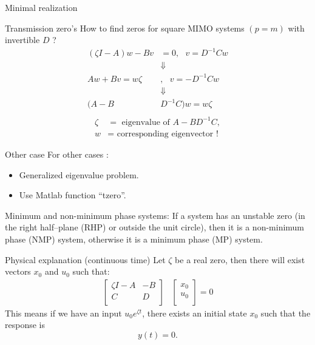 \begin{subsection}{Minimal realization}
\begin{frame}{Transmission zero's}
How to find zeros for square MIMO systems $(p = m)$ with
invertible $D$ ?
\begin{align*}
(\zeta I-A)w-Bv&=0,\text{ }v=D^{-1}Cw\\
&\Downarrow\\
Aw + Bv = w\zeta&,\text{ } v = −D^{-1}Cw\\
&\Downarrow\\
(A-B&D^{-1}C)w=w\zeta\\
\end{align*}
\vspace{-1cm}
\begin{align*}
\zeta &=\text{ eigenvalue of }A-BD^{-1}C,\\
w&=\text{ corresponding eigenvector !}
\end{align*}
\end{frame}

\begin{frame}{Other case}
For other cases :
\begin{itemize}
\item Generalized eigenvalue problem.
\item Use Matlab function “tzero”.
\end{itemize}
\vspace{0.5cm}
Minimum and non-minimum phase systems:
If a system has an unstable zero (in the right half–plane
(RHP) or outside the unit circle), then it is a non-minimum
phase (NMP) system, otherwise it is a minimum phase
(MP) system.
\end{frame}

\begin{frame}{Physical explanation (continuous time)}
Let $\zeta$ be a real zero, then there will exist vectors $x_0$ and $u_0$
such that:
\begin{align*}
\begin{bmatrix}
    \zeta I-A&-B\\
    C&D\\
\end{bmatrix}&
\begin{bmatrix}
    x_0\\
    u_0\\
\end{bmatrix}=0
\end{align*}
This means if we have an input $u_0e^{\zeta t}$, there exists an initial
state $x_0$ such that the response is
$$y(t) = 0.$$
\end{frame}


\end{subsection}
